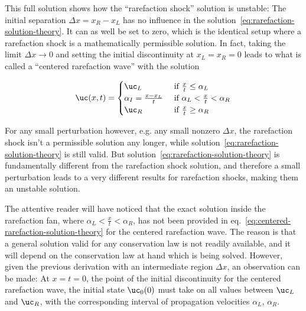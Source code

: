 This full solution shows how the ``rarefaction shock'' solution is unstable: The initial separation
$\Delta x = x_R - x_L$ has no influence in the solution~\ref{eq:rarefaction-solution-theory}. It
can as well be set to zero, which is the identical setup where a rarefaction shock is a
mathematically permissible solution. In fact, taking the limit $\Delta x \rightarrow 0$ and setting
the initial discontinuity at $x_L = x_R = 0$ leads to what is called a ``centered rarefaction wave''
with the solution

\begin{align}
\uc(x, t) = \begin{cases}
            \uc_L                           & \text{ if } \frac{x}{t} \leq \alpha_L \\
            \alpha_I = \frac{x - x_L}{t}    & \text{ if } \alpha_L < \frac{x}{t} <  \alpha_R \\
            \uc_R                           & \text{ if } \frac{x}{t} \geq \alpha_R
            \end{cases}
            \label{eq:centered-rarefaction-solution-theory}
\end{align}

For any small perturbation however, e.g. any small nonzero $\Delta x$, the rarefaction shock isn't a
permissible solution any longer, while solution~\ref{eq:rarefaction-solution-theory} is still valid.
But solution~\ref{eq:rarefaction-solution-theory} is fundamentally different from the rarefaction
shock solution, and therefore a small perturbation leads to a very different results for
rarefaction shocks, making them an unstable solution.

The attentive reader will have noticed that the exact solution inside the rarefaction fan, where
$\alpha_L < \frac{x}{t} <  \alpha_R$, has not been provided in
eq.~\ref{eq:centered-rarefaction-solution-theory} for the centered rarefaction wave. The reason is
that a general solution valid for any conservation law is not readily available, and it will depend
on the conservation law at hand which is being solved. However, given the previous derivation with
an intermediate region $\Delta x$, an observation can be made: At $x = t= 0$, the point of the
initial discontinuity for the centered rarefaction wave, the initial state $\uc_0(0)$ must take on
all values between $\uc_{L}$ and $\uc_R$, with the corresponding interval of propagation velocities
$\alpha_L$, $\alpha_R$.







